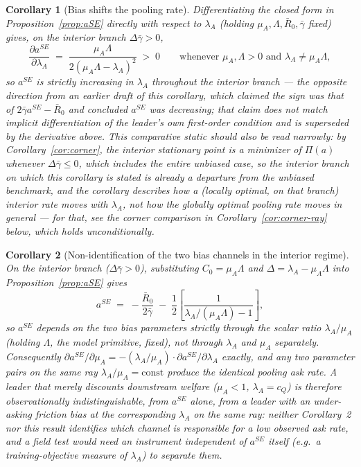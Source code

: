\documentclass[11pt]{article}
\newtheorem{corollary}{Corollary}
\begin{document}
\begin{corollary}[Bias shifts the pooling rate]
Differentiating the closed form in Proposition~\ref{prop:aSE} directly with
respect to $\lambda_A$ (holding $\mu_A,\Lambda,\bar R_0,\bar\gamma$ fixed) gives,
on the interior branch $\Delta\bar\gamma>0$,
\[
\frac{\partial a^{SE}}{\partial \lambda_A} \;=\; \frac{\mu_A\Lambda}{2(\mu_A\Lambda-\lambda_A)^2}
\;>\;0 \qquad \text{whenever } \mu_A,\Lambda>0 \text{ and } \lambda_A\ne\mu_A\Lambda,
\]
so $a^{SE}$ is strictly \emph{increasing} in $\lambda_A$ throughout the interior
branch --- the opposite direction from an earlier draft of this corollary, which
claimed the sign was that of $2\bar\gamma a^{SE}-\bar R_0$ and concluded
$a^{SE}$ was decreasing; that claim does not match implicit differentiation of
the leader's own first-order condition and is superseded by the derivative
above. This comparative static should also be read narrowly: by
Corollary~\ref{cor:corner}, the interior stationary point is a
\emph{minimizer} of $\Pi(a)$ whenever $\Delta\bar\gamma\le0$, which includes the
entire unbiased case, so the interior branch on which this corollary is stated
is already a departure from the unbiased benchmark, and the corollary describes
how a (locally optimal, on that branch) interior rate moves with $\lambda_A$,
not how the \emph{globally} optimal pooling rate moves in general --- for that,
see the corner comparison in Corollary~\ref{cor:corner-ray} below, which holds
unconditionally.
\end{corollary}

\begin{corollary}[Non-identification of the two bias channels in the interior regime]
\label{cor:mu-lambda}
On the interior branch ($\Delta\bar\gamma>0$), substituting $C_0=\mu_A\Lambda$ and
$\Delta=\lambda_A-\mu_A\Lambda$ into Proposition~\ref{prop:aSE} gives
\[
a^{SE} \;=\; -\frac{\bar R_0}{2\bar\gamma} \;-\; \frac{1}{2}
\left[\frac{1}{\lambda_A/(\mu_A\Lambda)-1}\right],
\]
so $a^{SE}$ depends on the two bias parameters strictly through the scalar ratio
$\lambda_A/\mu_A$ (holding $\Lambda$, the model primitive, fixed), not through
$\lambda_A$ and $\mu_A$ separately. Consequently
$\partial a^{SE}/\partial\mu_A = -(\lambda_A/\mu_A)\cdot\partial
a^{SE}/\partial\lambda_A$ exactly, and any two parameter pairs on the same ray
$\lambda_A/\mu_A=\text{const}$ produce the identical pooling ask rate. A leader
that merely discounts downstream welfare ($\mu_A<1$, $\lambda_A=c_Q$) is
therefore observationally indistinguishable, from $a^{SE}$ alone, from a leader
with an under-asking friction bias at the corresponding $\lambda_A$ on the same
ray: neither Corollary~2 nor this result identifies which channel is responsible
for a low observed ask rate, and a field test would need an instrument
independent of $a^{SE}$ itself (e.g.\ a training-objective measure of
$\lambda_A$) to separate them.
\end{corollary}
\end{document}
